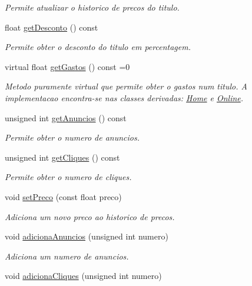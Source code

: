 \begin{DoxyCompactItemize}
\begin{DoxyCompactList}\small\item\em Permite atualizar o historico de precos do titulo. \end{DoxyCompactList}\item 
float \hyperlink{classTitulo_ae7df7d468f8220fa32b2772df4c53081}{get\+Desconto} () const
\begin{DoxyCompactList}\small\item\em Permite obter o desconto do titulo em percentagem. \end{DoxyCompactList}\item 
virtual float \hyperlink{classTitulo_a9272448eec05cd9c026c54824bf2e727}{get\+Gastos} () const =0
\begin{DoxyCompactList}\small\item\em Metodo puramente virtual que permite obter o gastos num titulo. A implementacao encontra-\/se nas classes derivadas\+: \hyperlink{classHome}{Home} e \hyperlink{classOnline}{Online}. \end{DoxyCompactList}\item 
unsigned int \hyperlink{classTitulo_ad36afe75694812eabe74af5fe32ad95b}{get\+Anuncios} () const
\begin{DoxyCompactList}\small\item\em Permite obter o numero de anuncios. \end{DoxyCompactList}\item 
unsigned int \hyperlink{classTitulo_a71d5b5985170de5612ec49c5c955f120}{get\+Cliques} () const
\begin{DoxyCompactList}\small\item\em Permite obter o numero de cliques. \end{DoxyCompactList}\item 
void \hyperlink{classTitulo_a08d0b556bebf6863edb62ed5dc19923c}{set\+Preco} (const float preco)
\begin{DoxyCompactList}\small\item\em Adiciona um novo preco ao historico de precos. \end{DoxyCompactList}\item 
void \hyperlink{classTitulo_a8004d12b8ae0d0746b999a6411df150c}{adiciona\+Anuncios} (unsigned int numero)
\begin{DoxyCompactList}\small\item\em Adiciona um numero de anuncios. \end{DoxyCompactList}\item 
void \hyperlink{classTitulo_a0cf99e4a2b522a7acae425593e87efec}{adiciona\+Cliques} (unsigned int numero)

\end{DoxyCompactItemize}
